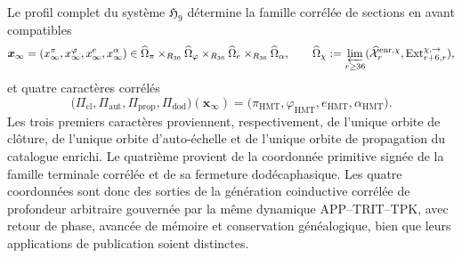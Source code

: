 \begin{theorem}
\label{thm:c27-cuadrirrelacion-generada}
Le profil complet du système \(\mathfrak H_9\) détermine la famille
corrélée de sections en avant compatibles
\[
 \boldsymbol x_\infty=
 (x_\infty^\pi,x_\infty^\varphi,x_\infty^e,x_\infty^\alpha)
 \in
 \widehat\Omega_\pi\times_{R_{36}}
 \widehat\Omega_\varphi\times_{R_{36}}
 \widehat\Omega_e\times_{R_{36}}\widehat\Omega_\alpha,
 \qquad
 \widehat\Omega_\chi:=
 \varprojlim_{r\ge36}
 (\widehat{\mathcal X}^{\mathrm{enr},\chi}_r,
  \operatorname{Ext}^{\chi,\rightarrow}_{r+6,r}),
\]
et quatre caractères corrélés
\[
 \bigl(\Pi_{\mathrm{cl}},\Pi_{\mathrm{aut}},
       \Pi_{\mathrm{prop}},\Pi_{\mathrm{dod}}\bigr)
       (\boldsymbol x_\infty)
 =\bigl(\pi_{\mathrm{HMT}},\varphi_{\mathrm{HMT}},
        e_{\mathrm{HMT}},\alpha_{\mathrm{HMT}}\bigr).
\]
Les trois premiers caractères proviennent, respectivement, de l'unique
orbite de clôture, de l'unique orbite d'auto-échelle et de l'unique
orbite de propagation du catalogue enrichi. Le quatrième provient de la
coordonnée primitive signée de la famille terminale corrélée et de sa
fermeture dodécaphasique. Les quatre coordonnées sont donc des sorties de la
génération coinductive corrélée de profondeur arbitraire gouvernée par
la même dynamique APP--TRIT--TPK, avec retour de phase, avancée de mémoire et
conservation généalogique, bien que leurs applications de publication soient
distinctes.
\end{theorem}

